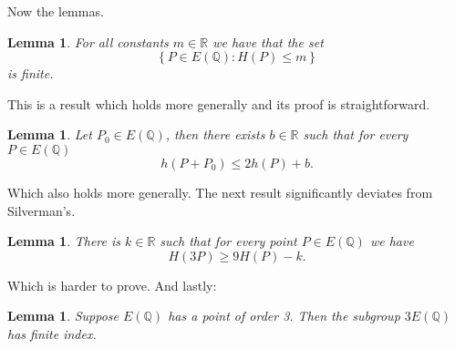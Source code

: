 \documentclass[11pt, oneside,a4paper]{article}
\newtheorem{lemma}[theorem]{Lemma}
\theoremstyle{definition}
\theoremstyle{remark}
\begin{document}
\noindent Now the lemmas.
\begin{lemma} \label{lem:property1}
  For all constants $m \in \mathbb{R}$ we have that the set
  \[ \left\{ P \in E(\mathbb{Q}) : H(P) \leq m \right\} \]
  is finite.
\end{lemma}
\noindent This is a result which holds more generally and its
proof is straightforward.
\begin{lemma} \label{lem:property2}
  Let $P_0 \in E(\mathbb{Q})$, then there exists $b \in \mathbb{R}$ such that
  for every $P \in E(\mathbb{Q})$
  \[ h(P + P_0) \leq 2h(P) + b. \]
\end{lemma}
\noindent Which also holds more generally. The next result
significantly deviates from Silverman's.
\begin{lemma} \label{lem:property3}
  There is $k \in \mathbb{R}$ such that for every point $P \in E(\mathbb{Q})$
  we have
  \[ H(3P) \geq 9H(P) - k. \]
\end{lemma}
\noindent Which is harder to prove. And lastly:
\begin{lemma} \label{lem:property4}
  Suppose $E(\mathbb{Q})$ has a point of order 3.
  Then the subgroup $3E(\mathbb{Q})$ has finite index.
\end{lemma}
\end{document}
